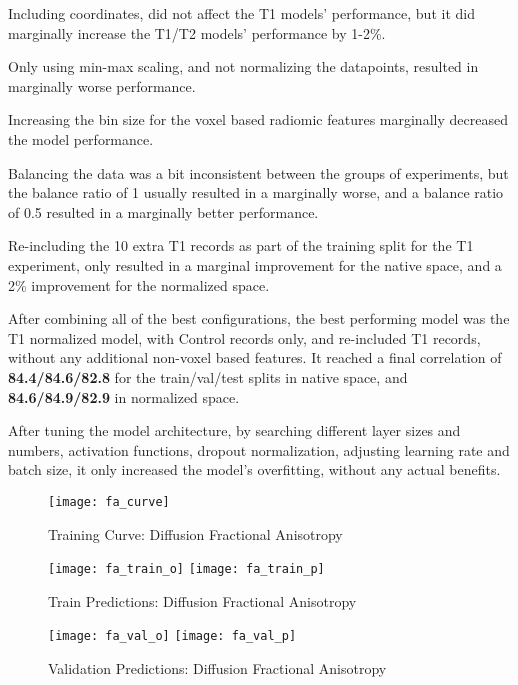 Including coordinates, did not affect the T1 models' performance, but it did marginally increase the T1/T2 models' performance by 1-2\%.\par
Only using min-max scaling, and not normalizing the datapoints, resulted in marginally worse performance.\par
Increasing the bin size for the voxel based radiomic features marginally decreased the model performance.\par
Balancing the data was a bit inconsistent between the groups of experiments, but the balance ratio of 1 usually resulted in a marginally worse, and a balance ratio of 0.5 resulted in a marginally better performance.\par
Re-including the 10 extra T1 records as part of the training split for the T1 experiment, only resulted in a marginal improvement for the native space, and a 2\% improvement for the normalized space.\par
After combining all of the best configurations, the best performing model was the T1 normalized model, with Control records only, and re-included T1 records, without any additional non-voxel based features. It reached a final correlation of \textbf{84.4/84.6/82.8} for the train/val/test splits in native space, and \textbf{84.6/84.9/82.9} in normalized space.\par
After tuning the model architecture, by searching different layer sizes and numbers, activation functions, dropout normalization, adjusting learning rate and batch size, it only increased the model's overfitting, without any actual benefits.

\begin{figure}[H]
\centering
\texttt{[image: fa\_curve]}
\caption{Training Curve: Diffusion Fractional Anisotropy}
\label{fig:curve-fa}
\end{figure}

\begin{figure}[H]
\centering
\texttt{[image: fa\_train\_o]}
\texttt{[image: fa\_train\_p]}
\caption{Train Predictions: Diffusion Fractional Anisotropy}
\label{fig:pred-tra-fa}
\end{figure}

\begin{figure}[H]
\centering
\texttt{[image: fa\_val\_o]}
\texttt{[image: fa\_val\_p]}
\caption{Validation Predictions: Diffusion Fractional Anisotropy}
\label{fig:pred-val-fa}
\end{figure}

